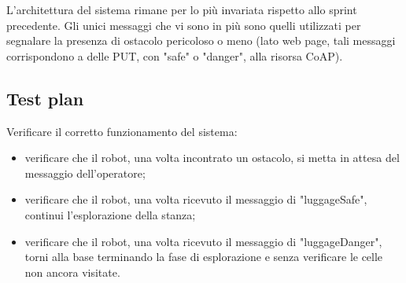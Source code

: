 L'architettura del sistema rimane per lo più invariata rispetto allo sprint precedente. Gli unici messaggi che vi sono in più sono quelli utilizzati per segnalare la presenza di ostacolo pericoloso o meno (lato web page, tali messaggi corrispondono a delle PUT, con "safe" o "danger", alla risorsa CoAP).

\subsection{Test plan}

Verificare il corretto funzionamento del sistema:

\begin{itemize}
\item verificare che il robot, una volta incontrato un ostacolo, si metta in attesa del messaggio dell'operatore;
\item verificare che il robot, una volta ricevuto il messaggio di "luggageSafe", continui l'esplorazione della stanza;
\item verificare che il robot, una volta ricevuto il messaggio di "luggageDanger", torni alla base terminando la fase di esplorazione e senza verificare le celle non ancora visitate.
\end{itemize}{}



